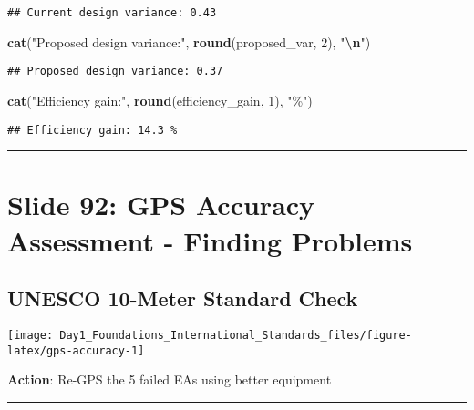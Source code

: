 \documentclass[
]{article}
\newenvironment{Shaded}{\begin{snugshade}}{\end{snugshade}}
\newcommand{\DecValTok}[1]{\textcolor[rgb]{0.00,0.00,0.81}{#1}}
\newcommand{\FunctionTok}[1]{\textcolor[rgb]{0.13,0.29,0.53}{\textbf{#1}}}
\newcommand{\NormalTok}[1]{#1}
\newcommand{\SpecialCharTok}[1]{\textcolor[rgb]{0.81,0.36,0.00}{\textbf{#1}}}
\newcommand{\StringTok}[1]{\textcolor[rgb]{0.31,0.60,0.02}{#1}}
\begin{document}
\begin{verbatim}
## Current design variance: 0.43
\end{verbatim}

\begin{Shaded}
\begin{Highlighting}[]
\FunctionTok{cat}\NormalTok{(}\StringTok{"Proposed design variance:"}\NormalTok{, }\FunctionTok{round}\NormalTok{(proposed\_var, }\DecValTok{2}\NormalTok{), }\StringTok{"}\SpecialCharTok{\textbackslash{}n}\StringTok{"}\NormalTok{)}
\end{Highlighting}
\end{Shaded}

\begin{verbatim}
## Proposed design variance: 0.37
\end{verbatim}

\begin{Shaded}
\begin{Highlighting}[]
\FunctionTok{cat}\NormalTok{(}\StringTok{"Efficiency gain:"}\NormalTok{, }\FunctionTok{round}\NormalTok{(efficiency\_gain, }\DecValTok{1}\NormalTok{), }\StringTok{"\%"}\NormalTok{)}
\end{Highlighting}
\end{Shaded}

\begin{verbatim}
## Efficiency gain: 14.3 %
\end{verbatim}

\begin{center}\rule{0.5\linewidth}{0.5pt}\end{center}

\section{Slide 92: GPS Accuracy Assessment - Finding
Problems}\label{slide-92-gps-accuracy-assessment---finding-problems}

\subsection{UNESCO 10-Meter Standard
Check}\label{unesco-10-meter-standard-check}

\texttt{[image: Day1\_Foundations\_International\_Standards\_files/figure-latex/gps-accuracy-1]}

\textbf{Action}: Re-GPS the 5 failed EAs using better equipment

\begin{center}\rule{0.5\linewidth}{0.5pt}\end{center}
\end{document}
